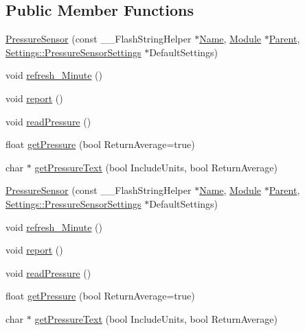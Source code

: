 \subsection*{Public Member Functions}
\begin{DoxyCompactItemize}
\item 
\hyperlink{class_pressure_sensor_a4eb0a9c44b5ebf1a1d932b8975e43b4b}{Pressure\+Sensor} (const \+\_\+\+\_\+\+Flash\+String\+Helper $\ast$\hyperlink{class_common_aeea91a726dbe988e515057b32ba0726f}{Name}, \hyperlink{class_module}{Module} $\ast$\hyperlink{class_pressure_sensor_a5f3f58f1dd495b1acf664f18d7566d22}{Parent}, \hyperlink{struct_settings_1_1_pressure_sensor_settings}{Settings\+::\+Pressure\+Sensor\+Settings} $\ast$Default\+Settings)
\item 
void \hyperlink{class_pressure_sensor_a1081c5a1073a4c5d0c790f92e53febf0}{refresh\+\_\+\+Minute} ()
\item 
void \hyperlink{class_pressure_sensor_ae9f360e068bc30f611ba50c7c9cf7e4a}{report} ()
\item 
void \hyperlink{class_pressure_sensor_a7a16702239fcf55a72e91c45fe4002ac}{read\+Pressure} ()
\item 
float \hyperlink{class_pressure_sensor_a39f2f08252640aeb9cf9c094ac796ed6}{get\+Pressure} (bool Return\+Average=true)
\item 
char $\ast$ \hyperlink{class_pressure_sensor_aa3eccb7d69ba28ff2f5c4688bf13f7e8}{get\+Pressure\+Text} (bool Include\+Units, bool Return\+Average)
\item 
\hyperlink{class_pressure_sensor_a4eb0a9c44b5ebf1a1d932b8975e43b4b}{Pressure\+Sensor} (const \+\_\+\+\_\+\+Flash\+String\+Helper $\ast$\hyperlink{class_common_aeea91a726dbe988e515057b32ba0726f}{Name}, \hyperlink{class_module}{Module} $\ast$\hyperlink{class_pressure_sensor_a5f3f58f1dd495b1acf664f18d7566d22}{Parent}, \hyperlink{struct_settings_1_1_pressure_sensor_settings}{Settings\+::\+Pressure\+Sensor\+Settings} $\ast$Default\+Settings)
\item 
void \hyperlink{class_pressure_sensor_a1081c5a1073a4c5d0c790f92e53febf0}{refresh\+\_\+\+Minute} ()
\item 
void \hyperlink{class_pressure_sensor_ae9f360e068bc30f611ba50c7c9cf7e4a}{report} ()
\item 
void \hyperlink{class_pressure_sensor_a7a16702239fcf55a72e91c45fe4002ac}{read\+Pressure} ()
\item 
float \hyperlink{class_pressure_sensor_a39f2f08252640aeb9cf9c094ac796ed6}{get\+Pressure} (bool Return\+Average=true)
\item 
char $\ast$ \hyperlink{class_pressure_sensor_a3cb6b01b624b7dc64a083a8cdac58451}{get\+Pressure\+Text} (bool Include\+Units, bool Return\+Average)
\end{DoxyCompactItemize}

